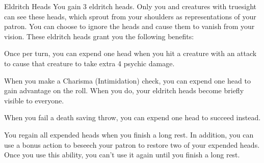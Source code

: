 \begin{DndComment}[]{Eldritch Heads}
	You gain 3 eldritch heads. Only you and creatures with truesight can see these heads, which sprout from your shoulders as representations of your patron. You can choose to ignore the heads and cause them to vanish from your vision. These eldritch heads grant you the following benefits:
	
	Once per turn, you can expend one head when you hit a creature with an attack to cause that creature to take extra 4 psychic damage.
	
	When you make a Charisma (Intimidation) check, you can expend one head to gain advantage on the roll. When you do, your eldritch heads become briefly visible to everyone.
	
	When you fail a death saving throw, you can expend one head to succeed instead.
	
	You regain all expended heads when you finish a long rest. In addition, you can use a bonus action to beseech your patron to restore two of your expended heads. Once you use this ability, you can’t use it again until you finish a long rest.
	
\end{DndComment}





\endgroup

